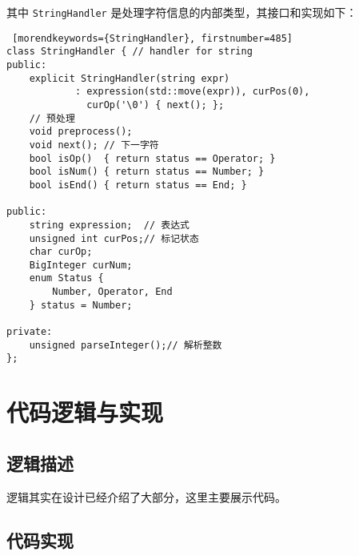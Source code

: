 其中 \lstinline{StringHandler} 是处理字符信息的内部类型，其接口和实现如下：

\begin{lstlisting} [morendkeywords={StringHandler}, firstnumber=485]
class StringHandler { // handler for string
public:
    explicit StringHandler(string expr)
            : expression(std::move(expr)), curPos(0),
              curOp('\0') { next(); };
    // 预处理
    void preprocess();
    void next(); // 下一字符
    bool isOp()  { return status == Operator; }
    bool isNum() { return status == Number; }
    bool isEnd() { return status == End; }

public:
    string expression;  // 表达式
    unsigned int curPos;// 标记状态
    char curOp;
    BigInteger curNum;
    enum Status {
        Number, Operator, End
    } status = Number;

private:
    unsigned parseInteger();// 解析整数
};
\end{lstlisting}


\section{代码逻辑与实现}

\subsection{逻辑描述}

逻辑其实在设计已经介绍了大部分，这里主要展示代码。

\subsection{代码实现}


